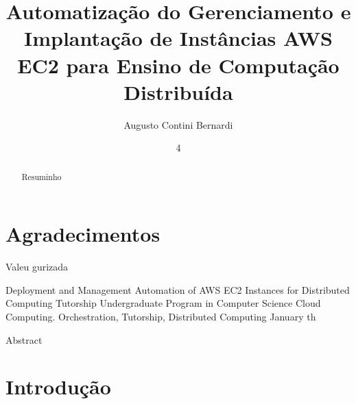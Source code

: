 \documentclass[tg]{mdtufsm}
\title{Automatização do Gerenciamento e Implantação de Instâncias AWS EC2 para Ensino de Computação Distribuída}
\author{Augusto Contini Bernardi}{Cezar}
\institute{Centro de Tecnologia}
\date{4}{Dezembro}{2016}
\begin{document}
\maketitle


\chapter*{Agradecimentos}
Valeu gurizada

\begin{abstract}
Resuminho
\end{abstract}

\begin{englishabstract}
	{Deployment and Management Automation of AWS EC2 Instances for Distributed Computing Tutorship}
	{Undergraduate Program in Computer Science}
	{Cloud Computing. Orchestration, Tutorship, Distributed Computing}
	{January}
	{th}
	
Abstract
	
\end{englishabstract}


\tableofcontents
\listoffigures

\setlength{\baselineskip}{1.5\baselineskip}


\chapter{Introdução}
\end{document}
